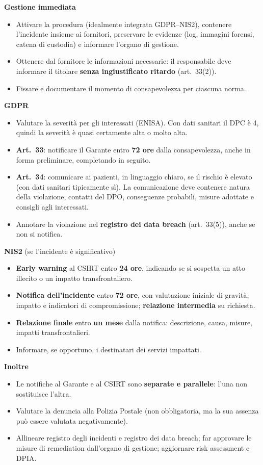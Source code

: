 \begin{soluzione}
\textbf{Gestione immediata}
\begin{itemize}
  \item Attivare la procedura (idealmente integrata GDPR--NIS2), contenere l'incidente insieme ai
    fornitori, preservare le evidenze (log, immagini forensi, catena di custodia) e informare l'organo
    di gestione.
  \item Ottenere dal fornitore le informazioni necessarie: il responsabile deve informare il titolare
    \textbf{senza ingiustificato ritardo} (art.~33(2)).
  \item Fissare e documentare il momento di consapevolezza per ciascuna norma.
\end{itemize}
\textbf{GDPR}
\begin{itemize}
  \item Valutare la severità per gli interessati (ENISA). Con dati sanitari il DPC è 4, quindi la
    severità è quasi certamente alta o molto alta.
  \item \textbf{Art.~33}: notificare il Garante entro \textbf{72 ore} dalla consapevolezza, anche in
    forma preliminare, completando in seguito.
  \item \textbf{Art.~34}: comunicare ai pazienti, in linguaggio chiaro, se il rischio è elevato (con
    dati sanitari tipicamente sì). La comunicazione deve contenere natura della violazione, contatti
    del DPO, conseguenze probabili, misure adottate e consigli agli interessati.
  \item Annotare la violazione nel \textbf{registro dei data breach} (art.~33(5)), anche se non si notifica.
\end{itemize}
\textbf{NIS2} (se l'incidente è significativo)
\begin{itemize}
  \item \textbf{Early warning} al CSIRT entro \textbf{24 ore}, indicando se si sospetta un atto
    illecito o un impatto transfrontaliero.
  \item \textbf{Notifica dell'incidente} entro \textbf{72 ore}, con valutazione iniziale di gravità,
    impatto e indicatori di compromissione; \textbf{relazione intermedia} su richiesta.
  \item \textbf{Relazione finale} entro \textbf{un mese} dalla notifica: descrizione, causa, misure,
    impatti transfrontalieri.
  \item Informare, se opportuno, i destinatari dei servizi impattati.
\end{itemize}
\textbf{Inoltre}
\begin{itemize}
  \item Le notifiche al Garante e al CSIRT sono \textbf{separate e parallele}: l'una non sostituisce l'altra.
  \item Valutare la denuncia alla Polizia Postale (non obbligatoria, ma la sua assenza può essere
    valutata negativamente).
  \item Allineare registro degli incidenti e registro dei data breach; far approvare le misure di
    remediation dall'organo di gestione; aggiornare risk assessment e DPIA.
\end{itemize}
\end{soluzione}

